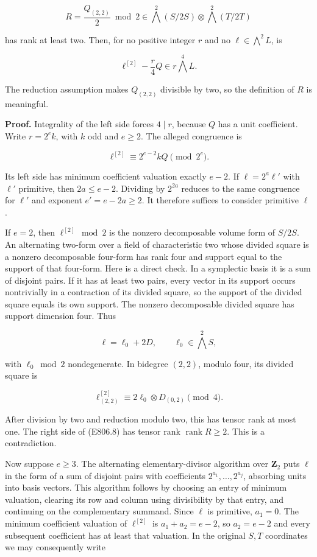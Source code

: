 \[
 R=\frac{Q_{(2,2)}}2\bmod2
 \in\bigwedge^2(S/2S)\otimes\bigwedge^2(T/2T)
\]

has rank at least two. Then, for no positive integer \(r\) and no
\(\ell\in\bigwedge^2L\), is

\[
 \ell^{[2]}-\frac r4Q\in r\bigwedge^4L.
 \tag{E806.7}
\]

The reduction assumption makes \(Q_{(2,2)}\) divisible by two, so the
definition of \(R\) is meaningful.

\textbf{Proof.} Integrality of the left side forces \(4\mid r\), because
\(Q\) has a unit coefficient. Write \(r=2^e k\), with \(k\) odd and
\(e\ge2\). The alleged congruence is

\[
 \ell^{[2]}\equiv 2^{e-2}kQ\pmod {2^e}.
 \tag{E806.8}
\]

Its left side has minimum coefficient valuation exactly \(e-2\). If
\(\ell=2^a\ell'\) with \(\ell'\) primitive, then \(2a\le e-2\). Dividing
by \(2^{2a}\) reduces to the same congruence for \(\ell'\) and exponent
\(e'=e-2a\ge2\). It therefore suffices to consider primitive \(\ell\).

If \(e=2\), then \(\ell^{[2]}\bmod2\) is the nonzero decomposable volume
form of \(S/2S\). An alternating two-form over a field of characteristic
two whose divided square is a nonzero decomposable four-form has rank
four and support equal to the support of that four-form. Here is a
direct check. In a symplectic basis it is a sum of disjoint pairs. If it
has at least two pairs, every vector in its support occurs nontrivially
in a contraction of its divided square, so the support of the divided
square equals its own support. The nonzero decomposable divided square
has support dimension four. Thus

\[
 \ell=\ell_0+2D,\qquad
 \ell_0\in\bigwedge^2S,
\]

with \(\ell_0\bmod2\) nondegenerate. In bidegree \((2,2)\), modulo four,
its divided square is

\[
 \ell^{[2]}_{(2,2)}
   \equiv 2\ell_0\otimes D_{(0,2)}\pmod4.
\]

After division by two and reduction modulo two, this has tensor rank at
most one. The right side of (E806.8) has tensor rank
\(\operatorname{rank}R\ge2\). This is a contradiction.

Now suppose \(e\ge3\). The alternating elementary-divisor algorithm over
\(\mathbf Z_2\) puts \(\ell\) in the form of a sum of disjoint pairs
with coefficients \(2^{a_1},\ldots,2^{a_j}\), absorbing units into basis
vectors. This algorithm follows by choosing an entry of minimum
valuation, clearing its row and column using divisibility by that entry,
and continuing on the complementary summand. Since \(\ell\) is
primitive, \(a_1=0\). The minimum coefficient valuation of
\(\ell^{[2]}\) is \(a_1+a_2=e-2\), so \(a_2=e-2\) and every subsequent
coefficient has at least that valuation. In the original \(S,T\)
coordinates we may consequently write

